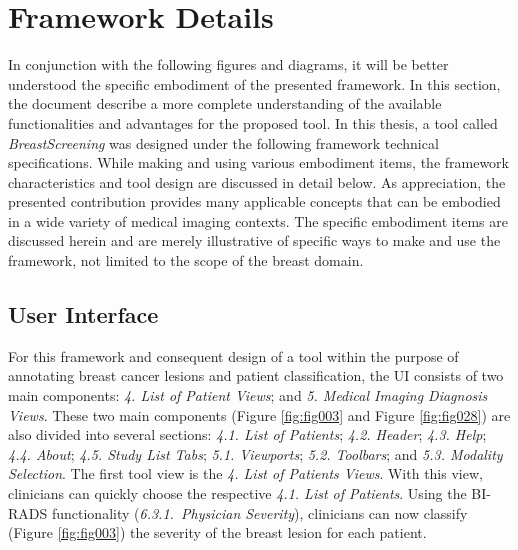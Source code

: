 \section{Framework Details}
\label{sec:sec004003}

In conjunction with the following figures and diagrams, it will be better understood the specific embodiment of the presented framework.
In this section, the document describe a more complete understanding of the available functionalities and advantages for the proposed tool.
In this thesis, a tool called {\it BreastScreening} was designed under the following framework technical specifications.
While making and using various embodiment items, the framework characteristics and tool design are discussed in detail below.
As appreciation, the presented contribution provides many applicable concepts that can be embodied in a wide variety of medical imaging contexts.
The specific embodiment items are discussed herein and are merely illustrative of specific ways to make and use the framework, not limited to the scope of the breast domain.

\subsection{User Interface}
\label{sec:sec004003001}

For this framework and consequent design of a tool within the purpose of annotating breast cancer lesions and patient classification, the \ac{UI} consists of two main components:
{\it 4. List of Patient Views}; and
{\it 5. Medical Imaging Diagnosis Views}.
These two main components (Figure \ref{fig:fig003} and Figure \ref{fig:fig028}) are also divided into several sections:
{\it 4.1. List of Patients};
{\it 4.2. Header};
{\it 4.3. Help};
{\it 4.4. About};
{\it 4.5. Study List Tabs};
{\it 5.1. Viewports};
{\it 5.2. Toolbars}; and
{\it 5.3. Modality Selection}.
The first tool view is the {\it 4. List of Patients Views}.
With this view, clinicians can quickly choose the respective {\it 4.1. List of Patients}.
Using the \ac{BI-RADS} functionality ({\it 6.3.1.~Physician Severity}), clinicians can now classify (Figure \ref{fig:fig003}) the severity of the breast lesion for each patient.

